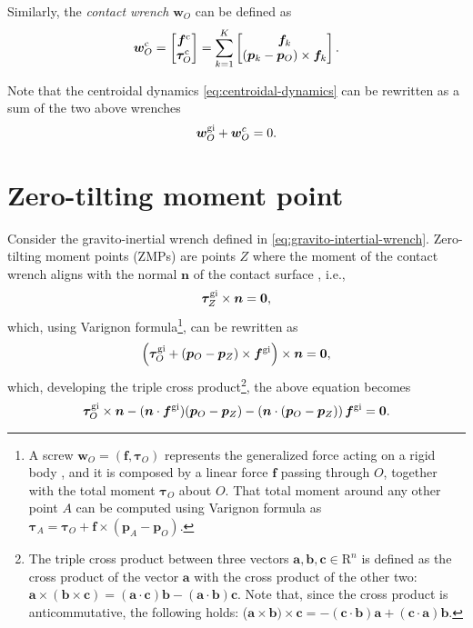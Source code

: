 Similarly, the \textit{contact wrench} $\bm{w}_O$ can be defined as
\begin{equation}
    \label{eq:contact-wrench}
    \bm{w}_O^{\rm c}
    =
    \begin{bmatrix}
        \bm{f}^{\rm c} \\
        \bm{\tau}_O^{\rm c}
    \end{bmatrix}
    =
    \sum_{k=1}^K
    \begin{bmatrix}
        \bm{f}_k\\
        (\bm{p}_k - \bm{p}_O) \times \bm{f}_k
    \end{bmatrix}.
\end{equation}

Note that the centroidal dynamics \eqref{eq:centroidal-dynamics} can be
rewritten as a sum of the two above wrenches
\begin{equation}
    \bm{w}_O^{\rm gi} + \bm{w}_O^c = 0.
\end{equation}

\section{Zero-tilting moment point}
\label{sec:zero-tilting-moment-point}
Consider the gravito-inertial wrench defined in \ref{eq:gravito-intertial-wrench}. Zero-tilting moment points (ZMPs) are points $Z$ where the moment of the contact wrench aligns with the normal $\bm{n}$ of the contact surface \cite{SardainBessonnet2004}, i.e.,
\begin{equation}
    \label{eq:zmp-non-tilting-condition}
    \bm{\tau}_Z^{\rm gi} \times \bm{n} = \bm{0},
\end{equation}
which, using Varignon formula\footnote{A screw $\bm{w}_O =
(\bm{f},\bm{\tau}_O)$ represents the generalized force acting on a rigid body
\cite{Featherstone2007RigidBodyDynamicsAlgorithms},
and it is composed by a linear force $\bm{f}$ passing through $O$, together with the
total moment $\bm{\tau}_O$ about $O$. That total moment around any other point
$A$ can be computed using Varignon formula as $\bm{\tau}_A=\bm{\tau}_O+\bm{f}\times(\bm{p}_A-\bm{p}_O)$.}, can be rewritten as
\begin{equation*}
    \left(\bm{\tau}_O^{\rm gi} + (\bm{p}_O - \bm{p}_Z) \times \bm{f}^{\rm gi}\right) \times \bm{n} = \bm{0},
\end{equation*}
which, developing the triple cross product\footnote{The triple cross product
between three vectors $\bm{a}, \bm{b}, \bm{c} \in \mathrm{R}^n$ is defined as
the cross product of the vector $\bm{a}$ with the cross product of the other
two: $\bm{a}\times(\bm{b}\times\bm{c})=(\bm{a}\cdot\bm{c})\bm{b}-
(\bm{a}\cdot\bm{b})\bm{c}$. Note that, since the cross product is anticommutative,
the following holds:
($\bm{a}\times\bm{b})\times\bm{c}=-(\bm{c}\cdot\bm{b})\bm{a}+
(\bm{c}\cdot\bm{a})\bm{b}$.}, the above equation becomes
\begin{equation}
    \bm{\tau}_O^{\rm gi} \times \bm{n} - (\bm{n} \cdot \bm{f}^{\rm gi}) (\bm{p}_O - \bm{p}_Z) - \left(\bm{n} \cdot (\bm{p}_O - \bm{p}_Z)\right) \bm{f}^{\rm gi} = \bm{0}.
\end{equation}

